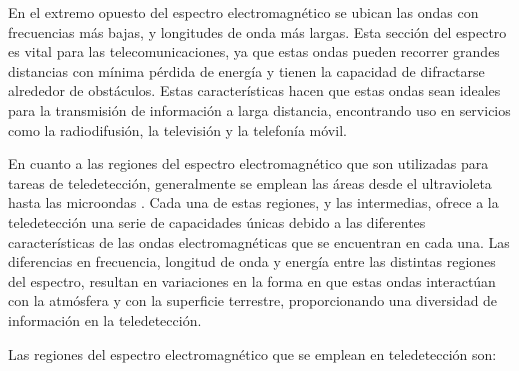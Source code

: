 En el extremo opuesto del espectro electromagnético se ubican las ondas con frecuencias más bajas, y longitudes de onda más largas. Esta sección del espectro es vital para las telecomunicaciones, ya que estas ondas pueden recorrer grandes distancias con mínima pérdida de energía y tienen la capacidad de difractarse alrededor de obstáculos. Estas características hacen que estas ondas sean ideales para la transmisión de información a larga distancia, encontrando uso en servicios como la radiodifusión, la televisión y la telefonía móvil.

En cuanto a las regiones del espectro electromagnético que son utilizadas para tareas de teledetección, generalmente se emplean las áreas desde el ultravioleta hasta las microondas \cite{chuvieco2016fundamentals}. Cada una de estas regiones, y las intermedias, ofrece a la teledetección una serie de capacidades únicas debido a las diferentes características de las ondas electromagnéticas que se encuentran en cada una. Las diferencias en frecuencia, longitud de onda y energía entre las distintas regiones del espectro, resultan en variaciones en la forma en que estas ondas interactúan con la atmósfera y con la superficie terrestre, proporcionando una diversidad de información en la teledetección.

Las regiones del espectro electromagnético que se emplean en teledetección son:

